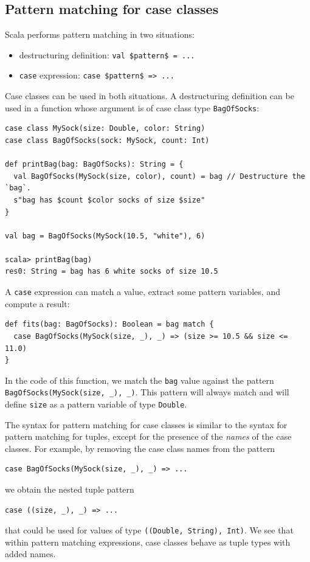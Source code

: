 \subsection{Pattern matching for case classes}

Scala performs pattern matching in two situations:
\begin{itemize}
\item destructuring definition: \lstinline[mathescape=true]!val $pattern$ = ...!
\item \lstinline!case! expression: \lstinline[mathescape=true]!case $pattern$ => ...!
\end{itemize}
Case classes can be used in both situations. A destructuring definition
can be used in a function whose argument is of case class type \lstinline!BagOfSocks!:
\begin{lstlisting}
case class MySock(size: Double, color: String)
case class BagOfSocks(sock: MySock, count: Int)

def printBag(bag: BagOfSocks): String = {
  val BagOfSocks(MySock(size, color), count) = bag // Destructure the `bag`.
  s"bag has $count $color socks of size $size"
}

val bag = BagOfSocks(MySock(10.5, "white"), 6)

scala> printBag(bag)
res0: String = bag has 6 white socks of size 10.5
\end{lstlisting}

A \lstinline!case! expression can match a value, extract some pattern
variables, and compute a result:
\begin{lstlisting}
def fits(bag: BagOfSocks): Boolean = bag match {
  case BagOfSocks(MySock(size, _), _) => (size >= 10.5 && size <= 11.0)
}
\end{lstlisting}
In the code of this function, we match the \lstinline!bag! value
against the pattern \lstinline!BagOfSocks(MySock(size, _), _)!. This
pattern will always match and will define \lstinline!size! as a pattern
variable of type \lstinline!Double!.

The syntax for pattern matching for case classes is similar to the
syntax for pattern matching for tuples, except for the presence of
the \emph{names} of the case classes. For example, by removing the
case class names from the pattern
\begin{lstlisting}
case BagOfSocks(MySock(size, _), _) => ...
\end{lstlisting}
we obtain the nested tuple pattern 
\begin{lstlisting}
case ((size, _), _) => ...
\end{lstlisting}
that could be used for values of type \lstinline!((Double, String), Int)!.
We see that within pattern matching expressions, case classes behave
as tuple types with added names. 


